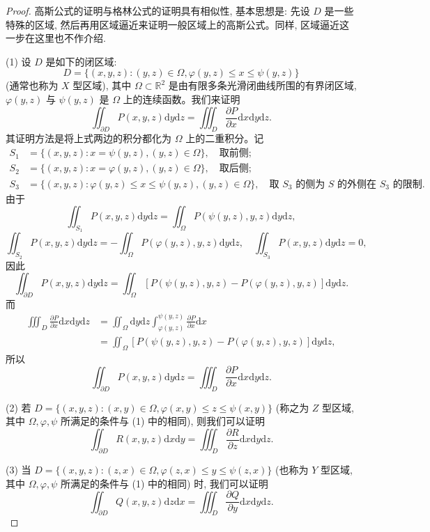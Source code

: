 \begin{proof}
高斯公式的证明与格林公式的证明具有相似性, 基本思想是: 先设 $D$ 是一些特殊的区域, 然后再用区域逼近来证明一般区域上的高斯公式。同样, 区域逼近这一步在这里也不作介绍.

(1) 设 $D$ 是如下的闭区域:
\[
  D=\{(x,y,z):(y,z)\in\Omega,\varphi(y,z)\leqslant x\leqslant\psi(y,z)\}
\]
(通常也称为 $X$ 型区域), 其中 $\Omega\subset\mathbb R^2$ 是由有限多条光滑闭曲线所围的有界闭区域, $\varphi(y,z)$ 与 $\psi(y,z)$ 是 $\Omega$ 上的连续函数。我们来证明
\[
  \iint_{\partial D}P(x,y,z)\mathrm dy\mathrm dz
  =\iiint_D\frac{\partial P}{\partial x}\mathrm dx\mathrm dy\mathrm dz.
\]
其证明方法是将上式两边的积分都化为 $\Omega$ 上的二重积分。记
\[
\begin{aligned}
  S_1&=\{(x,y,z):x=\psi(y,z),(y,z)\in\Omega\},\quad \text{取前侧};\\
  S_2&=\{(x,y,z):x=\varphi(y,z),(y,z)\in\Omega\},\quad \text{取后侧};\\
  S_3&=\{(x,y,z):\varphi(y,z)\leqslant x\leqslant\psi(y,z),(y,z)\in\Omega\},
    \quad \text{取 $S_3$ 的侧为 $S$ 的外侧在 $S_3$ 的限制}.
\end{aligned}
\]
由于
\[
  \iint_{S_1}P(x,y,z)\mathrm dy\mathrm dz
  =\iint_\Omega P(\psi(y,z),y,z)\mathrm dy\mathrm dz,
\]
\[
  \iint_{S_2}P(x,y,z)\mathrm dy\mathrm dz
  =-\iint_\Omega P(\varphi(y,z),y,z)\mathrm dy\mathrm dz,\quad
  \iint_{S_3}P(x,y,z)\mathrm dy\mathrm dz=0,
\]
因此
\[
  \iint_{\partial D}P(x,y,z)\mathrm dy\mathrm dz
  =\iint_\Omega[P(\psi(y,z),y,z)-P(\varphi(y,z),y,z)]\mathrm dy\mathrm dz.
\]
而
\[
\begin{aligned}
  \iiint_D\frac{\partial P}{\partial x}\mathrm dx\mathrm dy\mathrm dz
  &=\iint_\Omega\mathrm dy\mathrm dz
    \int_{\varphi(y,z)}^{\psi(y,z)}\frac{\partial P}{\partial x}\mathrm dx\\
  &=\iint_\Omega[P(\psi(y,z),y,z)-P(\varphi(y,z),y,z)]\mathrm dy\mathrm dz,
\end{aligned}
\]
所以
\[
  \iint_{\partial D}P(x,y,z)\mathrm dy\mathrm dz
  =\iiint_D\frac{\partial P}{\partial x}\mathrm dx\mathrm dy\mathrm dz.
\]

(2) 若 $D=\{(x,y,z):(x,y)\in\Omega,\varphi(x,y)\leqslant z\leqslant\psi(x,y)\}$ (称之为 $Z$ 型区域, 其中 $\Omega,\varphi,\psi$ 所满足的条件与 (1) 中的相同), 则我们可以证明
\[
  \iint_{\partial D}R(x,y,z)\mathrm dx\mathrm dy
  =\iiint_D\frac{\partial R}{\partial z}\mathrm dx\mathrm dy\mathrm dz.
\]

(3) 当 $D=\{(x,y,z):(z,x)\in\Omega,\varphi(z,x)\leqslant y\leqslant\psi(z,x)\}$ (也称为 $Y$ 型区域, 其中 $\Omega,\varphi,\psi$ 所满足的条件与 (1) 中的相同) 时, 我们可以证明
\[
  \iint_{\partial D}Q(x,y,z)\mathrm dz\mathrm dx
  =\iiint_D\frac{\partial Q}{\partial y}\mathrm dx\mathrm dy\mathrm dz.
\]


\end{proof}
